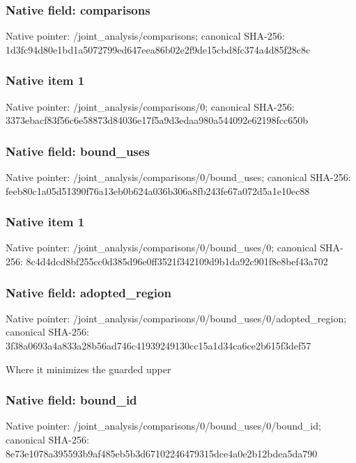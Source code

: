 \documentclass[10pt,a4paper]{article}
\begin{document}
\subsubsection{Native field: comparisons}
Native pointer: /joint\_\allowbreak{}analysis/comparisons; canonical SHA-256: 1d3fc94d80e1bd1a5072799ed647eea86b02e2f9de15cbd8fc374a4d85f28c8c

\subsubsection{Native item 1}
Native pointer: /joint\_\allowbreak{}analysis/comparisons/0; canonical SHA-256: 3373ebacf83f56c6e58873d84036e17f5a9d3edaa980a544092e62198fcc650b

\subsubsection{Native field: bound\_\allowbreak{}uses}
Native pointer: /joint\_\allowbreak{}analysis/comparisons/0/bound\_\allowbreak{}uses; canonical SHA-256: feeb80c1a05d51390f76a13eb0b624a036b306a8fb243fe67a072d5a1e10ec88

\subsubsection{Native item 1}
Native pointer: /joint\_\allowbreak{}analysis/comparisons/0/bound\_\allowbreak{}uses/0; canonical SHA-256: 8c4d4dcd8bf255cc0d385d96e0ff3521f342109d9b1da92c901f8e8bef43a702

\subsubsection{Native field: adopted\_\allowbreak{}region}
Native pointer: /joint\_\allowbreak{}analysis/comparisons/0/bound\_\allowbreak{}uses/0/adopted\_\allowbreak{}region; canonical SHA-256: 3f38a0693a4a833a28b56ad746c41939249130cc15a1d34ca6ce2b615f3def57

\begingroup\raggedright\sloppy Where it minimizes the guarded upper\par\endgroup

\subsubsection{Native field: bound\_\allowbreak{}id}
Native pointer: /joint\_\allowbreak{}analysis/comparisons/0/bound\_\allowbreak{}uses/0/bound\_\allowbreak{}id; canonical SHA-256: 8e73e1078a395593b9af485eb5b3d67102246479315dce4a0e2b12bdea5da790
\end{document}
